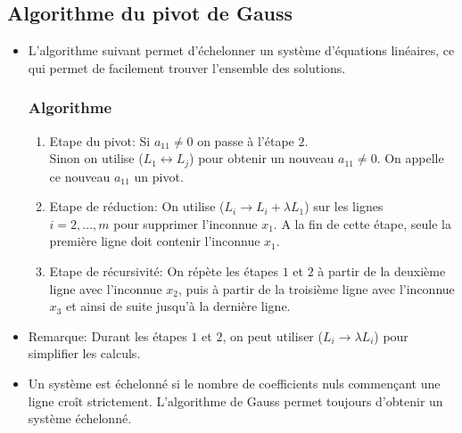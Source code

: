 \documentclass[12pt,a4paper]{article}
\begin{document}
\subsection{Algorithme du pivot de Gauss}
\begin{itemize}[label=$\bullet$]
\item L'algorithme suivant permet d'échelonner un système d'équations linéaires, ce qui permet de facilement trouver l'ensemble des solutions.
\subsubsection*{\textcolor{th!60!black}{Algorithme}}
\begin{enumerate}
    \item \textcolor{th!60!black}{Etape du pivot:} Si $a_{11}\neq 0$ on passe à l'étape $2$. 
    \\
    Sinon on utilise ($L_1 \leftrightarrow L_j$) pour obtenir un nouveau $a_{11}\neq 0$. On appelle ce nouveau $a_{11}$ un \colorbox{def!40}{pivot}.
    \item \textcolor{th!60!black}{Etape de réduction:} On utilise ($L_i \rightarrow L_i + \lambda L_1$) sur les lignes 
    \\
    $i=2,...,m$ pour supprimer l'inconnue $x_1$. A la fin de cette étape, seule la première ligne doit contenir l'inconnue $x_1$.
    \item \textcolor{th!60!black}{Etape de récursivité:} On répète les étapes $1$ et $2$ à partir de la deuxième ligne avec l'inconnue $x_2$, puis à partir de la troisième ligne avec l'inconnue $x_3$ et ainsi de suite jusqu'à la dernière ligne.
\end{enumerate}
\item \textcolor{expl!60!black}{Remarque:} Durant les étapes $1$ et $2$, on peut utiliser ($L_i \rightarrow \lambda L_i$) pour simplifier les calculs.
\item Un système est \colorbox{def!40}{échelonné} si le nombre de coefficients nuls commençant une ligne croît strictement. L'algorithme de Gauss permet toujours d'obtenir un système échelonné.

\end{itemize}
\newpage
\end{document}
